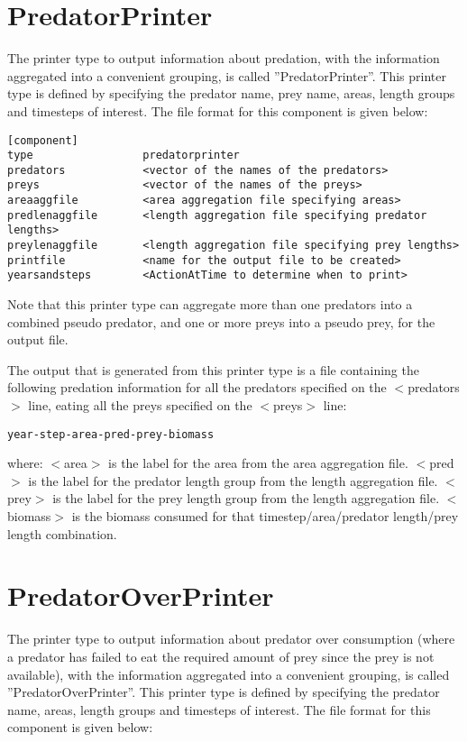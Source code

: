 \documentclass [a4paper, 10pt]{book}
\begin{document}
\section{PredatorPrinter}\label{sec:predatorprinter}
The printer type to output information about predation, with the information aggregated into a convenient grouping, is called ''PredatorPrinter''.  This printer type is defined by specifying the predator name, prey name, areas, length groups and timesteps of interest.  The file format for this component is given below:

{\small\begin{verbatim}
[component]
type                 predatorprinter
predators            <vector of the names of the predators>
preys                <vector of the names of the preys>
areaaggfile          <area aggregation file specifying areas>
predlenaggfile       <length aggregation file specifying predator lengths>
preylenaggfile       <length aggregation file specifying prey lengths>
printfile            <name for the output file to be created>
yearsandsteps        <ActionAtTime to determine when to print>
\end{verbatim}}

Note that this printer type can aggregate more than one predators into a combined pseudo predator, and one or more preys into a pseudo prey, for the output file.

\bigskip
The output that is generated from this printer type is a file containing the following predation information for all the predators specified on the $<$predators$>$ line, eating all the preys specified on the $<$preys$>$ line:

{\small\begin{verbatim}
year-step-area-pred-prey-biomass
\end{verbatim}}

where:\newline
$<$area$>$ is the label for the area from the area aggregation file.\newline
$<$pred$>$ is the label for the predator length group from the length aggregation file.\newline
$<$prey$>$ is the label for the prey length group from the length aggregation file.\newline
$<$biomass$>$ is the biomass consumed for that timestep/area/predator length/prey length combination.

\section{PredatorOverPrinter}\label{sec:predatoroverprinter}
The printer type to output information about predator over consumption (where a predator has failed to eat the required amount of prey since the prey is not available), with the information aggregated into a convenient grouping, is called ''PredatorOverPrinter''.  This printer type is defined by specifying the predator name, areas, length groups and timesteps of interest.  The file format for this component is given below:
\end{document}
